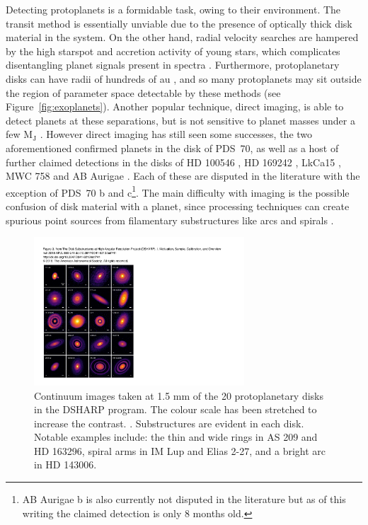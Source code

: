 Detecting protoplanets is a formidable task, owing to their environment.
The transit method is essentially unviable due to the presence of optically thick disk material in the system.
On the other hand, radial velocity searches are hampered by the high starspot and accretion activity of young stars, which complicates disentangling planet signals present in spectra \citep{desort2007}.
Furthermore, protoplanetary disks can have radii of hundreds of au \citep[e.g.][]{tripathi2017}, and so many protoplanets may sit outside the region of parameter space detectable by these methods (see Figure~\ref{fig:exoplanets}).
Another popular technique, direct imaging, is able to detect planets at these separations, but is not sensitive to planet masses under a few $\mathrm{M_J}$ \citep{jorquera2021}.
However direct imaging has still seen some successes, the two aforementioned confirmed planets in the disk of PDS~70, as well as a host of further claimed detections in the disks of HD 100546 \citep{quanz2013}, HD 169242 \citep{biller2014}, LkCa15 \citep{sallum2015}, MWC 758 \citep{reggiani2018} and AB Aurigae \citep{currie2022}. Each of these are disputed in the literature \citep{rameau2017,ligi2018,currie2019} with the exception of PDS~70 b and c\footnote{AB Aurigae b is also currently not disputed in the literature but as of this writing the claimed detection is only 8 months old.}.
The main difficulty with imaging is the possible confusion of disk material with a planet, since processing techniques can create spurious point sources from filamentary substructures like arcs and spirals \citep[eg.][]{rameau2017}.

\begin{figure}
    \centering
    \includegraphics[width = 0.7\textwidth]{figures/DSHARP.pdf}
    \caption{Continuum images taken at 1.5 mm of the 20 protoplanetary disks in the DSHARP program. The colour scale has been stretched to increase the contrast. \citep{andrews2018}. Substructures are evident in each disk. Notable examples include: the thin and wide rings in AS 209 and HD 163296, spiral arms in IM Lup and Elias 2-27, and a bright arc in HD 143006.}
    \label{fig:DSHARP}
\end{figure}


